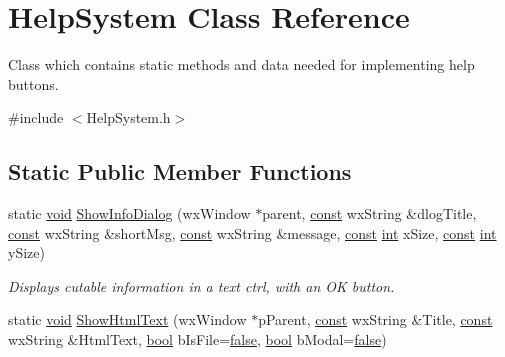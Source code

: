 \hypertarget{class_help_system}{}\section{Help\+System Class Reference}
\label{class_help_system}


Class which contains static methods and data needed for implementing help buttons.  




{\ttfamily \#include $<$Help\+System.\+h$>$}

\subsection*{Static Public Member Functions}
\begin{DoxyCompactItemize}
\item 
static \hyperlink{sound_8c_ae35f5844602719cf66324f4de2a658b3}{void} \hyperlink{class_help_system_a041ac56613a43fb256ef011fe0fbdac6}{Show\+Info\+Dialog} (wx\+Window $\ast$parent, \hyperlink{getopt1_8c_a2c212835823e3c54a8ab6d95c652660e}{const} wx\+String \&dlog\+Title, \hyperlink{getopt1_8c_a2c212835823e3c54a8ab6d95c652660e}{const} wx\+String \&short\+Msg, \hyperlink{getopt1_8c_a2c212835823e3c54a8ab6d95c652660e}{const} wx\+String \&message, \hyperlink{getopt1_8c_a2c212835823e3c54a8ab6d95c652660e}{const} \hyperlink{xmltok_8h_a5a0d4a5641ce434f1d23533f2b2e6653}{int} x\+Size, \hyperlink{getopt1_8c_a2c212835823e3c54a8ab6d95c652660e}{const} \hyperlink{xmltok_8h_a5a0d4a5641ce434f1d23533f2b2e6653}{int} y\+Size)
\begin{DoxyCompactList}\small\item\em Displays cutable information in a text ctrl, with an OK button. \end{DoxyCompactList}\item 
static \hyperlink{sound_8c_ae35f5844602719cf66324f4de2a658b3}{void} \hyperlink{class_help_system_a0f65f4989d7a2d94336b0373555ac384}{Show\+Html\+Text} (wx\+Window $\ast$p\+Parent, \hyperlink{getopt1_8c_a2c212835823e3c54a8ab6d95c652660e}{const} wx\+String \&Title, \hyperlink{getopt1_8c_a2c212835823e3c54a8ab6d95c652660e}{const} wx\+String \&Html\+Text, \hyperlink{mac_2config_2i386_2lib-src_2libsoxr_2soxr-config_8h_abb452686968e48b67397da5f97445f5b}{bool} b\+Is\+File=\hyperlink{mac_2config_2i386_2lib-src_2libsoxr_2soxr-config_8h_a65e9886d74aaee76545e83dd09011727}{false}, \hyperlink{mac_2config_2i386_2lib-src_2libsoxr_2soxr-config_8h_abb452686968e48b67397da5f97445f5b}{bool} b\+Modal=\hyperlink{mac_2config_2i386_2lib-src_2libsoxr_2soxr-config_8h_a65e9886d74aaee76545e83dd09011727}{false})

\end{DoxyCompactItemize}
